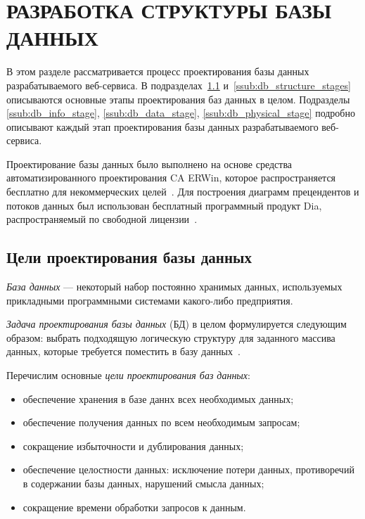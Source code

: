 \section[Разработка структуры БД]{РАЗРАБОТКА СТРУКТУРЫ БАЗЫ ДАННЫХ}
\label{sub:db_structure}

В этом разделе рассматривается процесс проектирования базы данных разрабатываемого
веб-сервиса.
В подразделах~\ref{ssub:db_structure_aims} и~\ref{ssub:db_structure_stages}
описываются основные этапы проектирования баз данных в целом.
Подразделы \ref{ssub:db_info_stage}, \ref{ssub:db_data_stage},
\ref{ssub:db_physical_stage} подробно описывают каждый этап проектирования
базы данных разрабатываемого веб-сервиса.

Проектирование базы данных было выполнено на основе средства автоматизированного
проектирования CA ERWin, которое распространяется бесплатно для некоммерческих целей~\cite{er_win_license}.
Для построения диаграмм прецендентов и потоков данных был использован бесплатный
программный продукт Dia, распространяемый по свободной лицензии~\cite{dia_license}.

\subsection{Цели проектирования базы данных}
\label{ssub:db_structure_aims}

\textit{База данных} --- некоторый набор постоянно хранимых данных,
используемых прикладными программными системами какого-либо предприятия.

\textit{Задача проектирования базы данных} (БД) в целом формулируется
следующим образом: выбрать подходящую логическую структуру для заданного
массива данных, которые требуется поместить в базу данных~\cite{date05}.

Перечислим основные \textit{цели проектирования баз данных}:
\begin{itemize}
\item
  обеспечение хранения в базе даннх всех необходимых данных;
\item
  обеспечение получения данных по всем необходимым запросам;
\item
  сокращение избыточности и дублирования данных;
\item
  обеспечение целостности данных: исключение потери данных, противоречий в
  содержании базы данных, нарушений смысла данных;
\item
  сокращение времени обработки запросов к данным.
\end{itemize}

